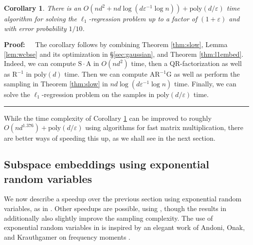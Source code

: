 \documentclass[11pt]{article}
\newtheorem{corollary}[theorem]{Corollary}
\newenvironment{proof}{\begin{trivlist} \item {\bf Proof:~~}}
  {\qed\end{trivlist}}
\newcommand{\mat}[1]{{\ensuremath{\bm{\mathrm{#1}}}}}
\def\matA{\mat{A}}
\def\matG{\mat{G}}
\def\matR{\mat{R}}
\def\matS{\mat{S}}
\def\qed{\hfill\rule{2mm}{2mm}}
\newcommand{\eps}{\varepsilon}
\newcommand{\poly}{{\mathrm{poly}}}
\begin{document}
\begin{corollary}\label{cor:first}
There is an $O(nd^2 + nd \log(d \eps^{-1}\log n)) + \poly(d/\eps)$ time algorithm for solving the $\ell_1$-regression problem
up to a factor of $(1+\eps)$ and with error probability $1/10$. 
\end{corollary}
\begin{proof}
The corollary follows by combining Theorem \ref{thm:slow}, Lemma \ref{lem:wcbse} and its optimization in
\S\ref{sec:gaussian}, and 
Theorem \ref{thm:l1embed}. Indeed, we can compute $\matS \cdot \matA$ in $O(nd^2)$ time, then a QR-factorization as
well as $\matR^{-1}$ in $\poly(d)$ time. Then we can compute $\matA \matR^{-1} \matG$ as well as perform
the sampling in Theorem \ref{thm:slow} in $nd \log(d \eps^{-1} \log n)$ time. Finally, we can solve the $\ell_1$-regression
problem on the samples in $\poly(d/\eps)$ time. 
\end{proof}
While the time complexity of Corollary \ref{cor:first} can be improved to roughly
$O(nd^{1.376}) + \poly(d/\eps)$ using algorithms for fast matrix multiplication, there are better
ways of speeding this up, as we shall see in the next section. 

\subsection{Subspace embeddings using exponential random variables}\label{sec:exponential}
We now describe a speedup over the previous section using exponential random variables, as in \cite{wz13}. Other
speedups are possible, using \cite{CDMMMW13,CW13,MM13}, though the results in \cite{wz13} additionally also 
slightly improve the sampling complexity. The use of exponential random variables in \cite{wz13} is inspired
by an elegant work of Andoni, Onak, and Krauthgamer on frequency moments \cite{AKO11,Andoni12}. 
\end{document}
